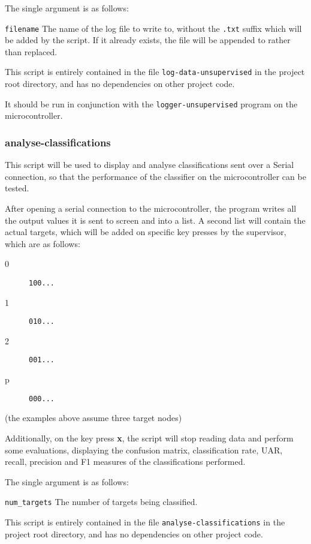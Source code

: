 \documentclass[a4paper]{article}
\begin{document}
The single argument is as follows:

\lstinline{filename} The name of the log file to write to, without the \lstinline{.txt} suffix which will be added by the script. If it already exists, the file will be appended to rather than replaced.

This script is entirely contained in the file \lstinline{log-data-unsupervised} in the project root directory, and has no dependencies on other project code.

It should be run in conjunction with the \lstinline{logger-unsupervised} program on the microcontroller.

\subsubsection{analyse-classifications}
\label{subsubsec:dc_csa_analyse}

This script will be used to display and analyse classifications sent over a Serial connection, so that the performance of the classifier on the microcontroller can be tested.

After opening a serial connection to the microcontroller, the program writes all the output values it is sent to screen and into a list. A second list will contain the actual targets, which will be added on specific key presses by the supervisor, which are as follows:

\begin{description}
\item[0] \lstinline|100...|
\item[1] \lstinline|010...|
\item[2] \lstinline|001...|
\item[p] \lstinline|000...|
\end{description}

(the examples above assume three target nodes)

Additionally, on the key press \textbf{x}, the script will stop reading data and perform some evaluations, displaying the confusion matrix, classification rate, UAR, recall, precision and F1 measures of the classifications performed.

The single argument is as follows:

\lstinline{num_targets} The number of targets being classified.

This script is entirely contained in the file \lstinline{analyse-classifications} in the project root directory, and has no dependencies on other project code.
\end{document}
